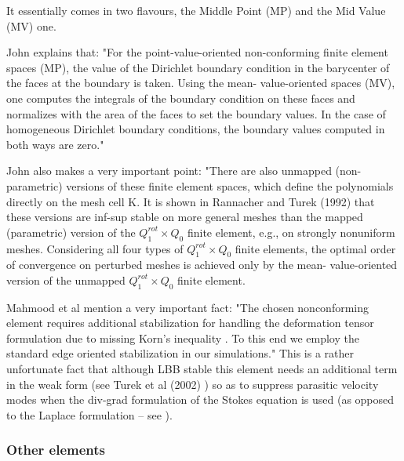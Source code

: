 It essentially comes in two flavours, the Middle Point (MP) and the Mid Value (MV) one.

\begin{remark} 
John \cite{john16} explains that: "For the point-value-oriented non-conforming finite element spaces (MP), 
the value of the Dirichlet boundary
condition in the barycenter of the faces at the boundary is taken. Using the mean-
value-oriented spaces (MV), one computes the integrals of the boundary condition on
these faces and normalizes with the area of the faces to set the boundary values.
In the case of homogeneous Dirichlet boundary conditions, the boundary values
computed in both ways are zero."
\end{remark}

\begin{remark} 
John also makes a very important point: "There are also unmapped (non-parametric) versions of 
these finite element spaces, which define the polynomials directly on the mesh cell K. It is shown in Rannacher
and Turek (1992) \cite{ratu92} that these versions are inf-sup stable on more general meshes than
the mapped (parametric) version of the $Q_1^{rot}\times Q_0$ finite element, e.g., on strongly
nonuniform meshes. Considering all four types of $Q_1^{rot}\times Q_0$ finite elements, the
optimal order of convergence on perturbed meshes is achieved only by the mean-
value-oriented version of the unmapped $Q_1^{rot}\times Q_0$   finite element.
\end{remark}

Mahmood et al \cite{maky17} mention a very important fact: "The chosen nonconforming element requires
additional stabilization for handling the deformation tensor formulation due to missing Korn’s inequality 
\cite{horg95,knob00}.
To this end we employ the standard edge oriented stabilization \cite{tuos02,tuou07} in our simulations."
This is a rather unfortunate fact that although LBB stable this element needs an additional 
term in the weak form (see Turek et al (2002) \cite{tuos02}) 
so as to suppress parasitic velocity modes when the div-grad formulation 
of the Stokes equation is used (as opposed to the Laplace formulation -- see \cite[Section 6.5.2]{dohu03}).













\subsubsection{Other elements}


